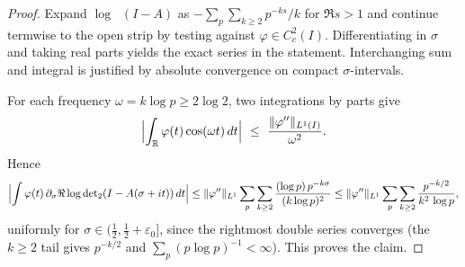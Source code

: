 \documentclass[11pt]{article}
\theoremstyle{definition}
\theoremstyle{remark}
\newcommand{\R}{\mathbb{R}}
\DeclareMathOperator{\dettwo}{det_2}
\begin{document}
\begin{proof}
Expand \(\log\dettwo(I-A)\) as \(-\sum_{p}\sum_{k\ge2}p^{-ks}/k\) for \(\Re s>1\) and continue termwise to the open strip by testing against \(\varphi\in C_c^2(I)\). Differentiating in \(\sigma\) and taking real parts yields the exact series in the statement. Interchanging sum and integral is justified by absolute convergence on compact \(\sigma\)-intervals.

For each frequency \(\omega=k\log p\ge 2\log 2\), two integrations by parts give
\[
\Bigl|\int_{\R}\varphi(t)\cos(\omega t)\,dt\Bigr|\ \le\ \frac{\|\varphi''\|_{L^1(I)}}{\omega^2}.
\]
Hence
\[
\Bigl|\int \varphi(t)\,\partial_\sigma\Re\log\dettwo(I-A(\sigma+it))\,dt\Bigr|
\le \|\varphi''\|_{L^1}\sum_{p}\sum_{k\ge2}\frac{(\log p)\,p^{-k\sigma}}{(k\log p)^2}
\le \|\varphi''\|_{L^1}\sum_{p}\sum_{k\ge2}\frac{p^{-k/2}}{k^2\,\log p},
\]
uniformly for \(\sigma\in(\tfrac12,\tfrac12+\varepsilon_0]\), since the rightmost double series converges (the \(k\ge2\) tail gives \(p^{-k/2}\) and \(\sum_{p}(p\log p)^{-1}<\infty\)). This proves the claim.
\end{proof}
\end{document}
